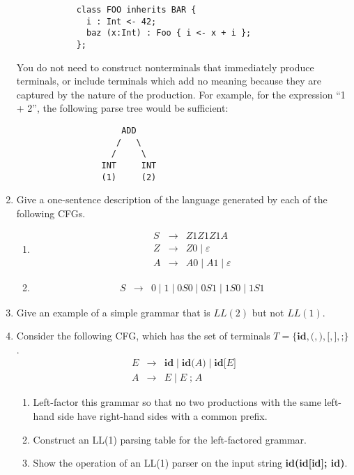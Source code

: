 \documentclass[11pt]{article}
\begin{document}
\begin{enumerate}
		\begin{verbatim}
			class FOO inherits BAR {
			  i : Int <- 42;
			  baz (x:Int) : Foo { i <- x + i }; 
			};
		\end{verbatim}
		
		You do not need to construct nonterminals that immediately produce
		terminals, or include terminals which add no meaning because they are
		captured by the nature of the production.  For example, for the
		expression ``1 + 2'', the following parse tree would be sufficient:
		\begin{verbatim}
		             ADD
		            /   \ 
		           /     \
		         INT     INT
		         (1)     (2)
		\end{verbatim}
	
	\item Give a one-sentence description of the language generated by
		each of the following CFGs.
		\begin{enumerate}
			\item
				\begin{eqnarray*}
				S & \rightarrow & Z1Z1Z1A \\
				Z & \rightarrow & Z0 \mid \varepsilon \\
				A & \rightarrow & A0 \mid A1 \mid \varepsilon
				\end{eqnarray*}
			\item
				\begin{eqnarray*}
				S & \rightarrow & 0 \mid 1 \mid 0S0 \mid 0S1 \mid 1S0 \mid 1S1
				\end{eqnarray*}
		\end{enumerate}
	
	\item Give an example of a simple grammar that is $LL(2)$ but not $LL(1)$.
	
	\item Consider the following CFG, which has the set of terminals
		$T = \{ \textbf{id}, \textbf{(}, \textbf{)}, \textbf{[}, \textbf{]},
		\textbf{;} \}$.
		\begin{eqnarray*}
			E & \rightarrow &
			\mathbf{id} \mid \mathbf{id} \textbf{(} A \textbf{)} \mid \textbf{id}
			\textbf{[} E \textbf{]} \\
			A & \rightarrow & E \mid E \; \textbf{;} \; A
		\end{eqnarray*}
		
		\begin{enumerate}
			\item Left-factor this grammar so that no two productions with the
				same left-hand side have right-hand sides with a common prefix.
			\item Construct an LL(1) parsing table for the left-factored grammar.
			\item Show the operation of an LL(1) parser on the input string
				\textbf{id(id[id]; id)}.
		\end{enumerate}
	

\end{enumerate}
\end{document}

